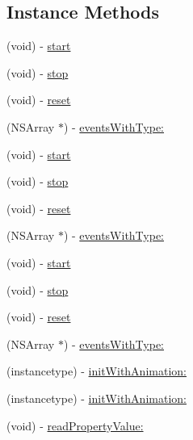 \subsection*{Instance Methods}
\begin{DoxyCompactItemize}
\item 
(void) -\/ \mbox{\hyperlink{interface_p_o_p_animation_tracer_a0b6ce421204778a564f094dde9b4a3ac}{start}}
\item 
(void) -\/ \mbox{\hyperlink{interface_p_o_p_animation_tracer_aed3b4e3f6cf7ed35047daf44351db7a0}{stop}}
\item 
(void) -\/ \mbox{\hyperlink{interface_p_o_p_animation_tracer_af539c16668e279fc6100f346bfe2d710}{reset}}
\item 
(N\+S\+Array $\ast$) -\/ \mbox{\hyperlink{interface_p_o_p_animation_tracer_a6a7fd2d3ca93d8cfeea745e51e2bad04}{events\+With\+Type\+:}}
\item 
(void) -\/ \mbox{\hyperlink{interface_p_o_p_animation_tracer_a0b6ce421204778a564f094dde9b4a3ac}{start}}
\item 
(void) -\/ \mbox{\hyperlink{interface_p_o_p_animation_tracer_aed3b4e3f6cf7ed35047daf44351db7a0}{stop}}
\item 
(void) -\/ \mbox{\hyperlink{interface_p_o_p_animation_tracer_af539c16668e279fc6100f346bfe2d710}{reset}}
\item 
(N\+S\+Array $\ast$) -\/ \mbox{\hyperlink{interface_p_o_p_animation_tracer_a6a7fd2d3ca93d8cfeea745e51e2bad04}{events\+With\+Type\+:}}
\item 
(void) -\/ \mbox{\hyperlink{interface_p_o_p_animation_tracer_a0b6ce421204778a564f094dde9b4a3ac}{start}}
\item 
(void) -\/ \mbox{\hyperlink{interface_p_o_p_animation_tracer_aed3b4e3f6cf7ed35047daf44351db7a0}{stop}}
\item 
(void) -\/ \mbox{\hyperlink{interface_p_o_p_animation_tracer_af539c16668e279fc6100f346bfe2d710}{reset}}
\item 
(N\+S\+Array $\ast$) -\/ \mbox{\hyperlink{interface_p_o_p_animation_tracer_a6a7fd2d3ca93d8cfeea745e51e2bad04}{events\+With\+Type\+:}}
\item 
(instancetype) -\/ \mbox{\hyperlink{interface_p_o_p_animation_tracer_a172bb65bdc4887fc5bfe4bcd38e5a5e8}{init\+With\+Animation\+:}}
\item 
(instancetype) -\/ \mbox{\hyperlink{interface_p_o_p_animation_tracer_a172bb65bdc4887fc5bfe4bcd38e5a5e8}{init\+With\+Animation\+:}}
\item 
(void) -\/ \mbox{\hyperlink{interface_p_o_p_animation_tracer_a219ed8a35e2d3fa997e5688386572f15}{read\+Property\+Value\+:}}

\end{DoxyCompactItemize}
